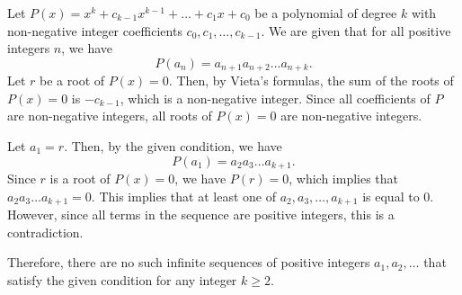 Let $P(x) = x^k + c_{k-1}x^{k-1} + \dots + c_1x + c_0$ be a polynomial of degree $k$ with non-negative integer coefficients $c_0, c_1, \dots, c_{k-1}$. We are given that for all positive integers $n$, we have
\[P(a_n) = a_{n+1}a_{n+2}\dots a_{n+k}.\]
Let $r$ be a root of $P(x) = 0$. Then, by Vieta's formulas, the sum of the roots of $P(x) = 0$ is $-c_{k-1}$, which is a non-negative integer. Since all coefficients of $P$ are non-negative integers, all roots of $P(x) = 0$ are non-negative integers.

Let $a_1 = r$. Then, by the given condition, we have
\[P(a_1) = a_2a_3\dots a_{k+1}.\]
Since $r$ is a root of $P(x) = 0$, we have $P(r) = 0$, which implies that $a_2a_3\dots a_{k+1} = 0$. This implies that at least one of $a_2, a_3, \dots, a_{k+1}$ is equal to $0$. However, since all terms in the sequence are positive integers, this is a contradiction.

Therefore, there are no such infinite sequences of positive integers $a_1, a_2, \dots$ that satisfy the given condition for any integer $k \geq 2$.
